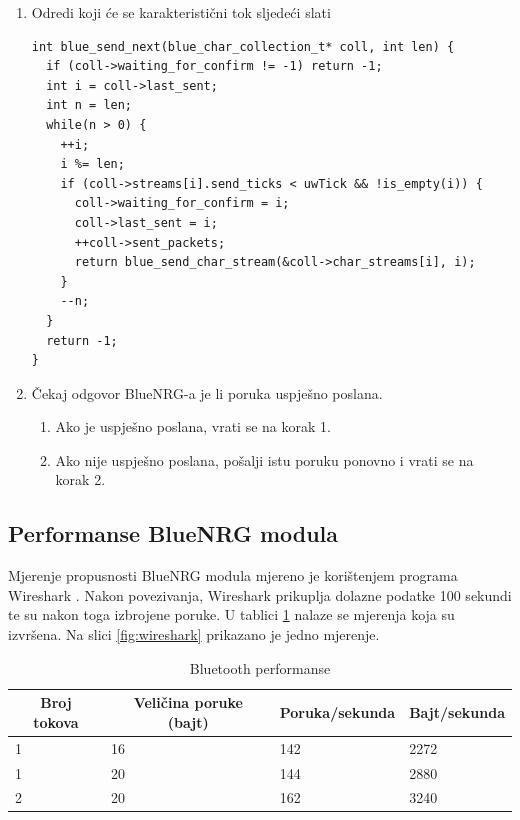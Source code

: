 \documentclass[times, utf8, diplomski]{diplomski}
\begin{document}
\begin{enumerate}
  \item Odredi koji će se karakteristični tok sljedeći slati
\begin{lstlisting}[caption = {Procedura za odabir karakterističnog toka koji će sljedeći biti poslan}]
int blue_send_next(blue_char_collection_t* coll, int len) {
  if (coll->waiting_for_confirm != -1) return -1;
  int i = coll->last_sent;
  int n = len;
  while(n > 0) {
    ++i;
    i %= len;
    if (coll->streams[i].send_ticks < uwTick && !is_empty(i)) {
      coll->waiting_for_confirm = i;
      coll->last_sent = i;
      ++coll->sent_packets;
      return blue_send_char_stream(&coll->char_streams[i], i);
    }
    --n;
  }
  return -1;
}
\end{lstlisting}
  \item Čekaj odgovor BlueNRG-a je li poruka uspješno poslana.
    \begin{enumerate}
      \item Ako je uspješno poslana, vrati se na korak 1.
      \item Ako nije uspješno poslana, pošalji istu poruku ponovno i vrati se na korak 2.
    \end{enumerate}
\end{enumerate}


\subsection{Performanse BlueNRG modula}

Mjerenje propusnosti BlueNRG modula mjereno je korištenjem programa Wireshark \cite{wireshark}. Nakon povezivanja, Wireshark prikuplja dolazne podatke 100 sekundi te su nakon toga izbrojene poruke. U tablici \ref{perftable} nalaze se mjerenja koja su izvršena. Na slici \ref{fig:wireshark} prikazano je jedno mjerenje.

\begin{table}[H]
  \begin{center}
    \begin{tabular}[c]{l|l|l|l}
      \hline
      \multicolumn{1}{c|}{\textbf{Broj tokova}} &
      \multicolumn{1}{c}{\textbf{Veličina poruke (bajt)}} &
      \multicolumn{1}{c}{\textbf{Poruka/sekunda}} &
      \multicolumn{1}{c}{\textbf{Bajt/sekunda}} \\
      \hline
      1 & 16 & 142 & 2272 \\
      1 & 20 & 144 & 2880 \\
      2 & 20 & 162 & 3240 \\
      \hline
    \end{tabular}
  \caption{Bluetooth performanse}
  \label{perftable}
  \end{center}
\end{table}
\end{document}
